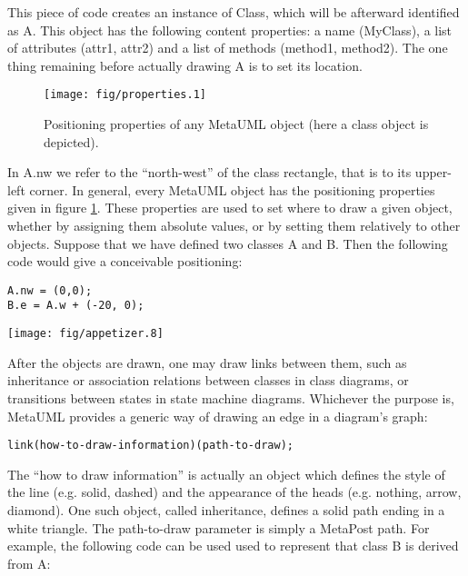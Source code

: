 \documentclass{article}
\newcommand{\code}{\ttfamily}
\begin{document}
This piece of code creates an instance of {\code Class}, which will be afterward
identified as {\code A}. This object has the following content properties: a name
({\code MyClass}), a list of attributes ({\code attr1}, {\code attr2})
and a list of methods ({\code method1}, {\code method2}). The one thing remaining
before actually drawing {\code A} is to set its location.

\begin{figure}
\centering
\texttt{[image: fig/properties.1]}
\caption{Positioning properties of any MetaUML object (here a class object is depicted).}
\label{fig:properties}
\end{figure}

In {\code A.nw} we refer to the ``north-west'' of the class rectangle, that is
to its upper-left corner. In general, every MetaUML object has the positioning
properties given in figure \ref{fig:properties}. These properties are used to set
where to draw a given object, whether by assigning them absolute values, or by setting
them relatively to other objects. Suppose that we have defined two classes
{\code A} and {\code  B}. Then the following code would give a conceivable positioning:

\begin{multicols}{2}
\begin{verbatim}
A.nw = (0,0);
B.e = A.w + (-20, 0);
\end{verbatim}
\columnbreak
\texttt{[image: fig/appetizer.8]}
\end{multicols}

After the objects are drawn, one may draw links between them, such as inheritance
or association relations between classes in class diagrams, or transitions between states
in state machine diagrams. Whichever the purpose is, MetaUML provides a generic
way of drawing an edge in a diagram's graph:

\begin{verbatim}
link(how-to-draw-information)(path-to-draw);
\end{verbatim}

The ``how to draw information'' is actually an object which defines the style
of the line (e.g. solid, dashed) and the appearance of the heads (e.g. nothing, arrow, diamond).
One such object, called {\code inheritance}, defines a solid path ending in
a white triangle. The {\code path-to-draw} parameter is simply a MetaPost path.
For example, the following code can be used used to represent that class {\code B} is derived from {\code A}:
\end{document}
